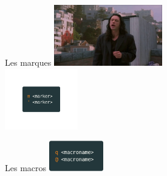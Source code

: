 \documentclass[10pt]{beamer}
\begin{document}
	\begin{frame}{Les marques}
		\center
		\includegraphics[height=100]{img/mark.jpeg}\\
		\includegraphics[height=100]{img/markers.png}
	\end{frame}

	\begin{frame}{Les macros}
		\center
		\includegraphics[height=50]{img/macros.png}
	\end{frame}
\end{document}
